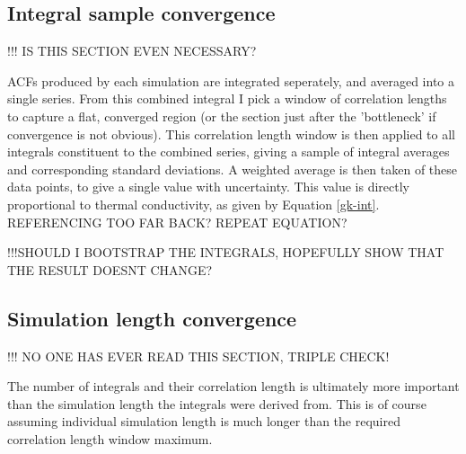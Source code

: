 \pagebreak

\subsection{\label{sec:3.GK.int}Integral sample convergence}

!!! IS THIS SECTION EVEN NECESSARY? 

ACFs produced by each simulation are integrated seperately, and averaged into a single series. 
From this combined integral I pick a window of correlation lengths to capture a flat, converged region (or the section just after the 'bottleneck' if convergence is not obvious). This correlation length window is then applied to all integrals constituent to the combined series, giving a sample of integral averages and corresponding standard deviations. A weighted average is then taken of these data points, to give a single value with uncertainty. This value is directly proportional to thermal conductivity, as given by Equation \ref{gk-int}. REFERENCING TOO FAR BACK? REPEAT EQUATION?

!!!SHOULD I BOOTSTRAP THE INTEGRALS, HOPEFULLY SHOW THAT THE RESULT DOESNT CHANGE?

\subsection{\label{sec:3.GK.sim}Simulation length convergence}




!!! NO ONE HAS EVER READ THIS SECTION, TRIPLE CHECK!

The number of integrals and their correlation length is ultimately more important than the simulation length the integrals were derived from. This is of course assuming individual simulation length is much longer than the required correlation length window maximum. 


